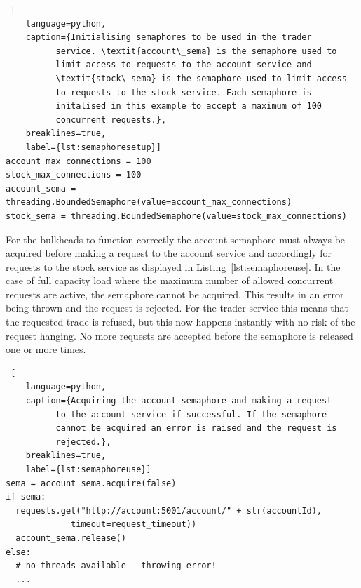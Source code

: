 \begin{lstlisting} [
	language=python,
	caption={Initialising semaphores to be used in the trader
          service. \textit{account\_sema} is the semaphore used to
          limit access to requests to the account service and
          \textit{stock\_sema} is the semaphore used to limit access
          to requests to the stock service. Each semaphore is
          initalised in this example to accept a maximum of 100
          concurrent requests.},
	breaklines=true,
	label={lst:semaphoresetup}]
account_max_connections = 100
stock_max_connections = 100
account_sema = threading.BoundedSemaphore(value=account_max_connections)
stock_sema = threading.BoundedSemaphore(value=stock_max_connections)
\end{lstlisting}
For the bulkheads to function correctly the account semaphore must
always be acquired before making a request to the account service and
accordingly for requests to the stock service as displayed in
Listing~\ref{lst:semaphoreuse}. In the case of full capacity load
where the maximum number of allowed concurrent requests are active,
the semaphore cannot be acquired. This results in an error being
thrown and the request is rejected. For the trader service this means
that the requested trade is refused, but this now happens instantly
with no risk of the request hanging. No more requests are accepted
before the semaphore is released one or more times.

\begin{lstlisting} [
	language=python,
	caption={Acquiring the account semaphore and making a request
          to the account service if successful. If the semaphore
          cannot be acquired an error is raised and the request is
          rejected.},
	breaklines=true,
	label={lst:semaphoreuse}]
sema = account_sema.acquire(false)
if sema:
  requests.get("http://account:5001/account/" + str(accountId),
             timeout=request_timeout))
  account_sema.release()
else:
  # no threads available - throwing error!
  ...
\end{lstlisting}

